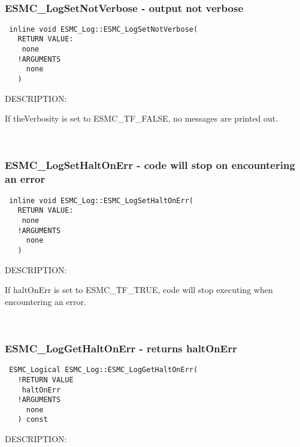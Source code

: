 \mbox{}\hrulefill\ 
 

  \subsubsection [ESMC\_LogSetNotVerbose] {ESMC\_LogSetNotVerbose - output not verbose }


  
\begin{verbatim} 
 inline void ESMC_Log::ESMC_LogSetNotVerbose(
   RETURN VALUE:
    none
   !ARGUMENTS
     none
   )
 \end{verbatim}
{\sf DESCRIPTION:\\ }


   If theVerbosity is set to ESMC\_TF\_FALSE, no messages are printed out. 
    
 
\mbox{}\hrulefill\ 
 

  \subsubsection [ESMC\_LogSetHaltOnErr] {ESMC\_LogSetHaltOnErr - code will stop on encountering an error }


  
\begin{verbatim} 
 inline void ESMC_Log::ESMC_LogSetHaltOnErr(
   RETURN VALUE:
    none
   !ARGUMENTS
     none
   )
 \end{verbatim}
{\sf DESCRIPTION:\\ }


   If haltOnErr is set to ESMC\_TF\_TRUE, code will stop executing when
   encountering an error.
    
 
\mbox{}\hrulefill\ 
 

  \subsubsection [ESMC\_LogGetHaltOnErr] {ESMC\_LogGetHaltOnErr - returns haltOnErr}


  
\begin{verbatim} 
 ESMC_Logical ESMC_Log::ESMC_LogGetHaltOnErr(
   !RETURN VALUE
    haltOnErr
   !ARGUMENTS
     none
   ) const
 \end{verbatim}
{\sf DESCRIPTION:\\ }


